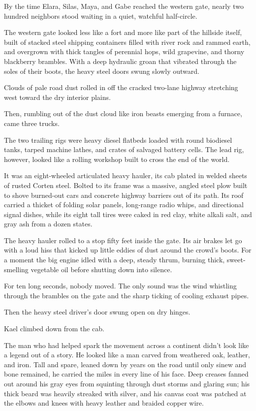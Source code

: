 By the time Elara, Silas, Maya, and Gabe reached the western gate, nearly two hundred neighbors stood waiting in a quiet, watchful half-circle. 

The western gate looked less like a fort and more like part of the hillside itself, built of stacked steel shipping containers filled with river rock and rammed earth, and overgrown with thick tangles of perennial hops, wild grapevine, and thorny blackberry brambles. With a deep hydraulic groan that vibrated through the soles of their boots, the heavy steel doors swung slowly outward.

Clouds of pale road dust rolled in off the cracked two-lane highway stretching west toward the dry interior plains. 

Then, rumbling out of the dust cloud like iron beasts emerging from a furnace, came three trucks.

The two trailing rigs were heavy diesel flatbeds loaded with round biodiesel tanks, tarped machine lathes, and crates of salvaged battery cells. The lead rig, however, looked like a rolling workshop built to cross the end of the world.

It was an eight-wheeled articulated heavy hauler, its cab plated in welded sheets of rusted Corten steel. Bolted to its frame was a massive, angled steel plow built to shove burned-out cars and concrete highway barriers out of its path. Its roof carried a thicket of folding solar panels, long-range radio whips, and directional signal dishes, while its eight tall tires were caked in red clay, white alkali salt, and gray ash from a dozen states. 

The heavy hauler rolled to a stop fifty feet inside the gate. Its air brakes let go with a loud hiss that kicked up little eddies of dust around the crowd's boots. For a moment the big engine idled with a deep, steady thrum, burning thick, sweet-smelling vegetable oil before shutting down into silence.

For ten long seconds, nobody moved. The only sound was the wind whistling through the brambles on the gate and the sharp ticking of cooling exhaust pipes.

Then the heavy steel driver’s door swung open on dry hinges.

Kael climbed down from the cab.

The man who had helped spark the movement across a continent didn't look like a legend out of a story. He looked like a man carved from weathered oak, leather, and iron. Tall and spare, leaned down by years on the road until only sinew and bone remained, he carried the miles in every line of his face. Deep creases fanned out around his gray eyes from squinting through dust storms and glaring sun; his thick beard was heavily streaked with silver, and his canvas coat was patched at the elbows and knees with heavy leather and braided copper wire.

